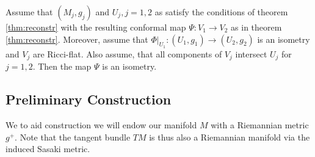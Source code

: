 \begin{corollary}\label{cor:thmcor}
Assume that $(M_j,g_j)$ and $U_j,j=1,2$ as satisfy the conditions of theorem \ref{thm:reconstr} with the resulting conformal map $\Psi:V_1\to V_2$ as in theorem \ref{thm:reconstr}. Moreover, assume that $\Phi\rvert_{U_1}:(U_1,g_1)\to(U_2,g_2)$ is an isometry and $V_j$ are Ricci-flat. Also assume, that all components of $V_j$ intersect $U_j$ for $j=1,2$. Then the map $\Psi$ is an isometry.
\end{corollary}
\subsection{Preliminary Construction}
We to aid construction we will endow our manifold $M$ with a Riemannian metric $g^+$. Note that the tangent bundle $TM$ is thus also a Riemannian manifold via the induced Sasaki metric.

